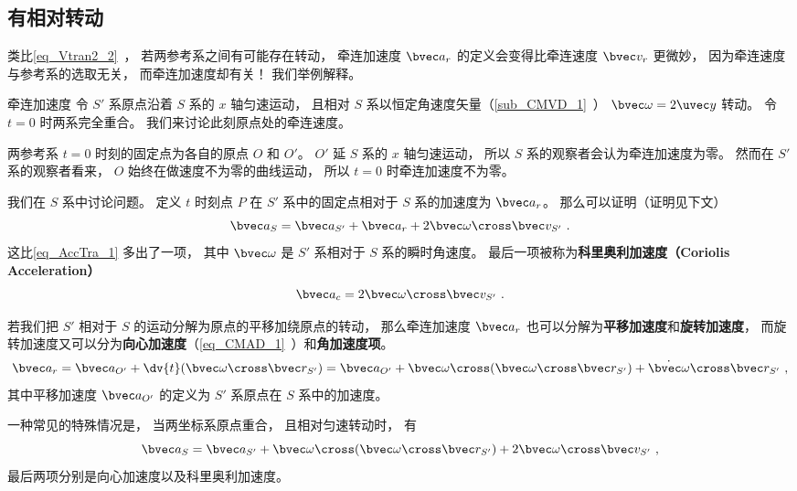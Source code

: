 \subsection{有相对转动}
类比\autoref{eq_Vtran2_2}~， 若两参考系之间有可能存在转动， 牵连加速度 $\bvec a_{r}$ 的定义会变得比牵连速度 $\bvec v_r$ 更微妙， 因为牵连速度与参考系的选取无关， 而牵连加速度却有关！ 我们举例解释。

\begin{example}{牵连加速度}
令 $S'$ 系原点沿着 $S$ 系的 $x$ 轴匀速运动， 且相对 $S$ 系以恒定角速度矢量（\autoref{sub_CMVD_1}~） $\bvec \omega = 2\uvec y$ 转动。 令 $t = 0$ 时两系完全重合。 我们来讨论此刻原点处的牵连速度。

两参考系 $t = 0$ 时刻的固定点为各自的原点 $O$ 和 $O'$。 $O'$ 延 $S$ 系的 $x$ 轴匀速运动， 所以 $S$ 系的观察者会认为牵连加速度为零。 然而在 $S'$ 系的观察者看来， $O$ 始终在做速度不为零的曲线运动， 所以 $t = 0$ 时牵连加速度不为零。
\end{example}

我们在 $S$ 系中讨论问题。 定义 $t$ 时刻点 $P$ 在 $S'$ 系中的固定点相对于 $S$ 系的加速度为 $\bvec a_{r}$。 那么可以证明（证明见下文）
\begin{equation}\label{eq_AccTra_2}
\bvec a_S = \bvec a_{S'} + \bvec a_{r} + 2 \bvec \omega \cross \bvec v_{S'}~.
\end{equation}
这比\autoref{eq_AccTra_1} 多出了一项， 其中 $\bvec \omega$ 是 $S'$ 系相对于 $S$ 系的瞬时角速度。 最后一项被称为\textbf{科里奥利加速度（Coriolis Acceleration）}
\begin{equation}\label{eq_AccTra_4}
\bvec a_c = 2 \bvec \omega \cross \bvec v_{S'}~.
\end{equation}


若我们把 $S'$ 相对于 $S$ 的运动分解为原点的平移加绕原点的转动， 那么牵连加速度 $\bvec a_r$ 也可以分解为\textbf{平移加速度}和\textbf{旋转加速度}， 而旋转加速度又可以分为\textbf{向心加速度}（\autoref{eq_CMAD_1}~）和\textbf{角加速度项}。
\begin{equation}\label{eq_AccTra_5}
\bvec a_{r} = \bvec a_{O'} + \dv{t}(\bvec\omega\cross\bvec r_{S'})
= \bvec a_{O'} + \bvec\omega\cross(\bvec\omega\cross\bvec r_{S'}) + \dot{\bvec\omega} \cross\bvec r_{S'}~,
\end{equation}
其中平移加速度 $\bvec a_{O'}$ 的定义为 $S'$ 系原点在 $S$ 系中的加速度。

一种常见的特殊情况是， 当两坐标系原点重合， 且相对匀速转动时， 有
\begin{equation}
\bvec a_S = \bvec a_{S'} + \bvec\omega\cross(\bvec\omega\cross\bvec r_{S'}) + 2 \bvec \omega \cross \bvec v_{S'}~,
\end{equation}
最后两项分别是向心加速度以及科里奥利加速度。

